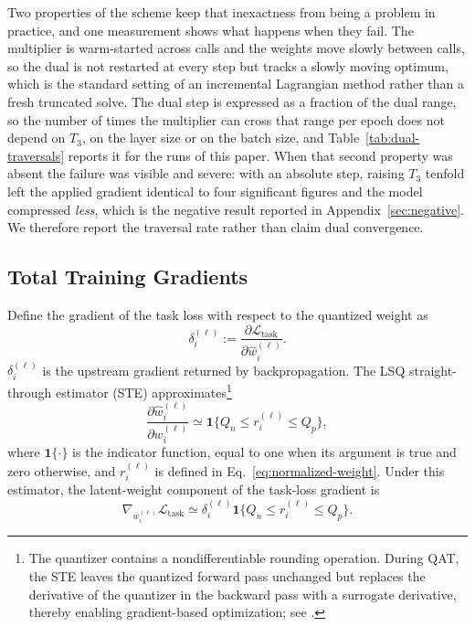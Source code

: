 \documentclass{article}
\begin{document}
Two properties of the scheme keep that inexactness from being a problem in
practice, and one measurement shows what happens when they fail. The multiplier
is warm-started across calls and the weights move slowly between calls, so the
dual is not restarted at every step but tracks a slowly moving optimum, which is
the standard setting of an incremental Lagrangian method rather than a fresh
truncated solve. The dual step is expressed as a fraction of the dual range, so
the number of times the multiplier can cross that range per epoch does not depend
on $T_3$, on the layer size or on the batch size, and
Table~\ref{tab:dual-traversals} reports it for the runs of this paper. When that
second property was absent the failure was visible and severe: with an absolute
step, raising $T_3$ tenfold left the applied gradient identical to four
significant figures and the model compressed \emph{less}, which is the negative
result reported in Appendix~\ref{sec:negative}. We therefore report the
traversal rate rather than claim dual convergence.


\subsection{Total Training Gradients}
\label{app:total-grad}
\label{app:total-gradients}

Define the gradient of the task loss with respect to the quantized weight as
\[
  \delta_i^{(\ell)}
  :=
  \frac{\partial\mathcal L_{\mathrm{task}}}
       {\partial\widehat w_i^{(\ell)}}.
\]
$\delta_i^{(\ell)}$ is the upstream gradient returned by backpropagation. The
LSQ straight-through estimator (STE) approximates\footnote{The quantizer contains a
nondifferentiable rounding operation. During QAT, the STE leaves the quantized
forward pass unchanged but replaces the derivative of the quantizer in the
backward pass with a surrogate derivative, thereby enabling gradient-based
optimization; see \citet{bengio2013estimating,esser2020lsq}.} 
\begin{equation}
  \frac{\partial\widehat w_i^{(\ell)}}
       {\partial w_i^{(\ell)}}
  \simeq
  \mathbf 1\{Q_n\leq r_i^{(\ell)}\leq Q_p\},
  \label{eq:weight-ste}
\end{equation}
where $\mathbf 1\{\cdot\}$ is the indicator function, equal to one when its
argument is true and zero otherwise, and $r_i^{(\ell)}$ is defined in Eq.~\eqref{eq:normalized-weight}. 
Under this estimator, the latent-weight component of the task-loss gradient is
\begin{equation}
  \nabla_{w_i^{(\ell)}}\mathcal L_{\mathrm{task}}
  \simeq
  \delta_i^{(\ell)}
  \mathbf 1\{Q_n\leq r_i^{(\ell)}\leq Q_p\}.
  \label{eq:task-weight-gradient}
\end{equation}
\end{document}
